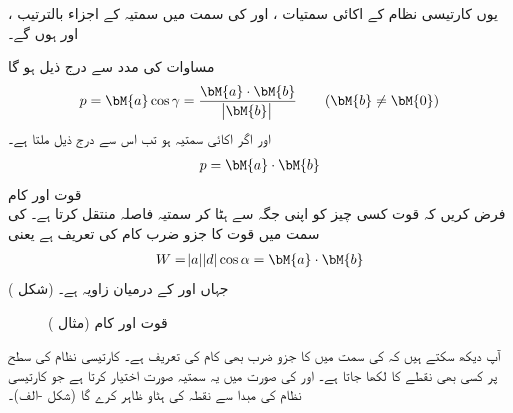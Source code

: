 یوں کارتیسی نظام کے اکائی سمتیات ،  اور  کی سمت میں سمتیہ  کے اجزاء بالترتیب ،  اور  ہوں گے۔

مساوات  کی مدد سے درج ذیل ہو گا
\begin{align}\label{مساوات_الجبرا_عمودی_سایہ_الف}
p=\bM{a}\cos \gamma=\frac{\bM{a}\cdot\bM{b}}{\abs{\bM{b}}} \quad \quad (\bM{b}\ne \bM{0})
\end{align}
اور اگر  اکائی سمتیہ ہو تب اس سے درج ذیل ملتا ہے۔
\begin{align}\label{مساوات_الجبرا_عمودی_سایہ_ب}
p=\bM{a}\cdot\bM{b}
\end{align}
\quad قوت اور کام\\
فرض کریں کہ قوت  کسی چیز کو اپنی جگہ سے ہٹا کر سمتیہ فاصلہ  منتقل کرتا ہے۔ کی سمت میں قوت کا جزو ضرب  کام  کی تعریف ہے یعنی
\begin{align}
W=\abs{a}\abs{d}\cos \alpha=\bM{a}\cdot \bM{b}
\end{align} 
جہاں  اور  کے درمیان زاویہ  ہے۔ (شکل )
\begin{figure}
\centering
{}
\caption{قوت اور کام (مثال )}
\label{شکل_مثال_الجبرا_قوت_کام}
\end{figure}

آپ دیکھ سکتے ہیں کہ  کی سمت میں  کا جزو ضرب  بھی کام کی تعریف ہے۔
کارتیسی نظام کی  سطح پر  کسی بھی نقطے کا     لکھا جاتا ہے۔ اور  کی صورت میں یہ سمتیہ  صورت اختیار کرتا ہے جو کارتیسی نظام کی مبدا سے نقطہ  کی ہٹاو ظاہر کرے گا (شکل -الف)۔

